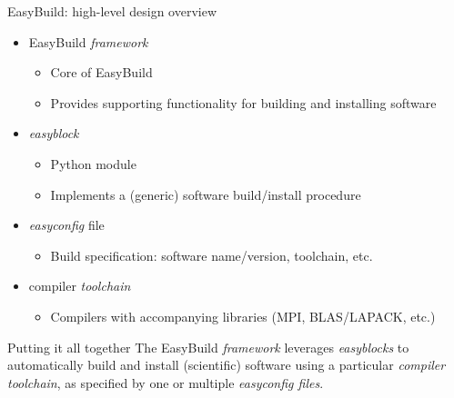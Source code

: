 \documentclass[10pt,xcolor={usenames,dvipsnames}]{beamer}
\begin{document}
\begin{frame}{EasyBuild: high-level design overview}
\begin{itemize}
    \item
        EasyBuild \emph{framework}
        \begin{itemize}
            \item
                Core of EasyBuild
            \item
                Provides supporting functionality for building and installing software
        \end{itemize}
    \item
        \emph{easyblock}
        \begin{itemize}
            \item
                Python module
            \item
                Implements a (generic) software build/install procedure
        \end{itemize}
    \item
        \emph{easyconfig} file
        \begin{itemize}
            \item
                Build specification: software name/version, toolchain, etc.
        \end{itemize}
    \item
        compiler \emph{toolchain}
        \begin{itemize}
            \item
                Compilers with accompanying libraries (MPI, BLAS/LAPACK, etc.)
        \end{itemize}
\end{itemize}

\medskip\quad\quad
\begin{minipage}{0.9\textwidth}
    \begin{block}{Putting it all together}
        The EasyBuild \emph{framework} leverages \emph{easyblocks} to
        automatically build and install (scientific) software using a
        particular \emph{compiler toolchain}, as specified by one or multiple
        \emph{easyconfig files}.
    \end{block}
\end{minipage}
\end{frame}
\end{document}
